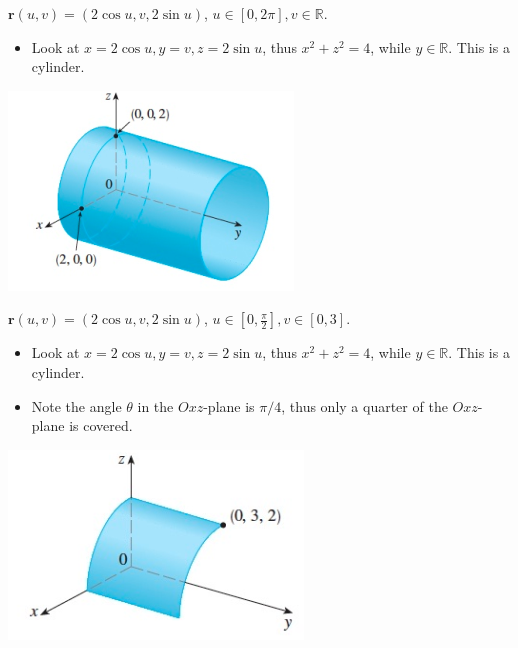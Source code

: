\begin{example} $\textbf{r}(u,v) = (2\cos u, v, 2\sin u)$, $u\in [0,2\pi], v\in \mathbb{R}$. 
\begin{itemize}
    \item Look at $x = 2\cos u, y = v, z = 2\sin u$, thus $x^2+z^2 = 4$, while $y\in \mathbb{R}$. This is a cylinder.
\end{itemize}
    \begin{center}
        \includegraphics[scale=0.7]{images/13-ex2.png}
    \end{center}
\end{example}

\clearpage

\begin{example} $\textbf{r}(u,v) = (2\cos u, v, 2\sin u)$, $u\in \left[0,\frac{\pi}{2}\right], v\in [0,3]$. 
\begin{itemize}
    \item Look at $x = 2\cos u, y = v, z = 2\sin u$, thus $x^2+z^2 = 4$, while $y\in \mathbb{R}$. This is a cylinder.
    \item Note the angle $\theta$ in the $Oxz$-plane is $\pi/4$, thus only a quarter of the $Oxz$-plane is covered. 
\end{itemize}
    \begin{center}
        \includegraphics[scale=0.7]{images/13-ex3.png}
    \end{center}
\end{example}



